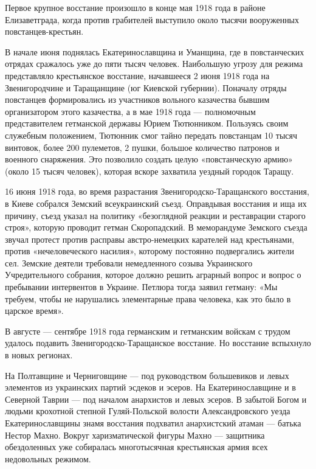 \begin{itemize}
Первое крупное восстание произошло в конце мая 1918 года в районе
Елизаветграда, когда против грабителей выступило около тысячи вооруженных
повстанцев-крестьян.


В начале июня поднялась Екатеринославщина и Уманщина, где в повстанческих
отрядах сражалось уже до пяти тысяч человек. Наибольшую угрозу для режима
представляло крестьянское восстание, начавшееся 2 июня 1918 года на
Звенигородчине и Таращанщине (юг Киевской губернии). Поначалу отряды повстанцев
формировались из участников вольного казачества бывшим организатором этого
казачества, а в мае 1918 года — полномочным представителем гетманской державы
Юрием Тютюнником. Пользуясь своим служебным положением, Тютюнник смог тайно
передать повстанцам 10 тысяч винтовок, более 200 пулеметов, 2 пушки, большое
количество патронов и военного снаряжения. Это позволило создать целую
«повстанческую армию» (около 15 тысяч человек), которая вскоре захватила
уездный городок Таращу.

16 июня 1918 года, во время разрастания Звенигородско-Таращанского восстания, в
Киеве собрался Земский всеукраинский съезд. Оправдывая восстания и ища их
причину, съезд указал на политику «безоглядной реакции и реставрации старого
строя», которую проводит гетман Скоропадский. В меморандуме Земского съезда
звучал протест против расправы австро-немецких карателей над крестьянами,
против «нечеловеческого насилия», которому постоянно подвергались жители сел.
Земские деятели требовали немедленного созыва Украинского Учредительного
собрания, которое должно решить аграрный вопрос и вопрос о пребывании
интервентов в Украине. Петлюра тогда заявил гетману: «Мы требуем, чтобы не
нарушались элементарные права человека, как это было в царское время».

В августе — сентябре 1918 года германским и гетманским войскам с трудом удалось
подавить Звенигородско-Таращанское восстание. Но восстание вспыхнуло в новых
регионах.

На Полтавщине и Черниговщине — под руководством большевиков и левых элементов
из украинских партий эсдеков и эсеров. На Екатеринославщине и в Северной Таврии
— под началом анархистов и левых эсеров. В забытой Богом и людьми крохотной
степной Гуляй-Польской волости Александровского уезда Екатеринославщины знамя
восстания подхватил анархистский атаман — батька Нестор Махно. Вокруг
харизматической фигуры Махно — защитника обездоленных уже собиралась
многотысячная крестьянская армия всех недовольных режимом.


\end{itemize}
